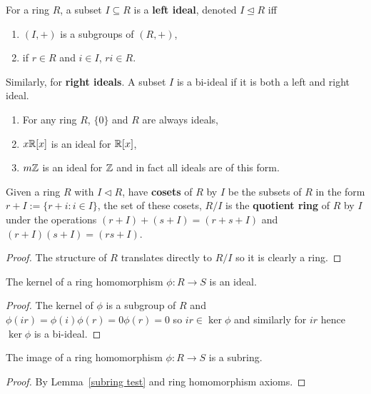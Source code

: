 \documentclass{report}
\begin{document}
\begin{definition}[Ideal]
    For a ring $R$, a subset $I\subseteq R$ is a \textbf{left ideal}, denoted $I\unlhd R$ iff \begin{enumerate}
        \item $(I,+)$ is a subgroups of $(R,+)$,
        \item if $r\in R$ and $i\in I$, $ri\in R$.
    \end{enumerate} Similarly, for \textbf{right ideals}. A subset $I$ is a bi-ideal if it is both a left and right ideal.
\end{definition}

\begin{examples}
    \begin{enumerate}
        \item For any ring $R$, $\{0\}$ and $R$ are always ideals,
        \item $x\mathbb{R}[x]$ is an ideal for $\mathbb{R}[x]$,
        \item $m\mathbb{Z}$ is an ideal for $\mathbb{Z}$ and in fact all ideals are of this form.
    \end{enumerate}
\end{examples}

\begin{definition}
    Given a ring $R$ with $I\lhd R$, have \textbf{cosets} of $R$ by $I$ be the subsets of $R$ in the form $r+I:=\{r+i:i\in I\}$, the set of these cosets, $R/I$ is the \textbf{quotient ring} of $R$ by $I$ under the operations $(r+I)+(s+I)=(r+s+I)$ and $(r+I)(s+I)=(rs+I)$.\begin{proof}
        The structure of $R$ translates directly to $R/I$ so it is clearly a ring.
    \end{proof}
\end{definition}

\begin{lemma}\label{iso1}
    The kernel of a ring homomorphism $\phi:R\rightarrow S$ is an ideal. \begin{proof}
        The kernel of $\phi$ is a subgroup of $R$ and $\phi(ir)=\phi(i)\phi(r)=0\phi(r)=0$ so $ir\in\ker\phi$ and similarly for $ir$ hence $\ker\phi$ is a bi-ideal.
    \end{proof}
\end{lemma}

\begin{lemma}\label{iso2}
    The image of a ring homomorphism $\phi:R\rightarrow S$ is a subring. \begin{proof}
        By Lemma~\ref{subring test} and ring homomorphism axioms.
    \end{proof}
\end{lemma}
\end{document}
